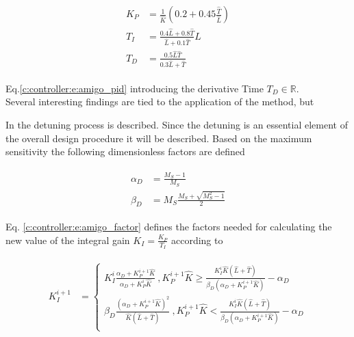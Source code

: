 \begin{align}
\begin{split}
K_P &= \frac{1}{\hat{K}} \left( 0.2 + 0.45 \frac{\hat{T}}{\hat{L}}\right)\\
T_I &= \frac{0.4\hat{L}+0.8\hat{T}}{\hat{L}+0.1\hat{T}}\hat{L}\\
T_D &= \frac{0.5 \hat{L}\hat{T}}{0.3\hat{L}+\hat{T}}
\end{split}
\label{c:controller:e:amigo_pid}
\end{align}

Eq.\ref{c:controller:e:amigo_pid} introducing the derivative Time $T_D \in \mathbb{R}$.\\

Several interesting findings are tied to the application of the method, but 


In \cite[p.253 ff.]{Astrom2006} the detuning process is described. Since the detuning is an essential element of the overall design procedure it will be described. Based on the maximum sensitivity the following dimensionless factors are defined 

\begin{align}
\begin{split}
\alpha_D &= \frac{M_S-1}{M_S}\\
\beta_D &= M_S \frac{M_S+\sqrt{M_S^2 -1}}{2} 
\end{split}
\label{c:controller:e:amigo_factor}
\end{align}

Eq. \ref{c:controller:e:amigo_factor} defines the factors needed for calculating the new value of the integral gain $K_I = \frac{K_P}{T_I}$ according to

\begin{align}
\begin{split}
K_I^{i+1} &= \begin{cases}
	K_I^i \frac{\alpha_D + K_P^{i+1} \hat{K}}{\alpha_D + K_P^{i} \hat{K}} ~, K_P^{i+1} \hat{K} \geq \frac{K_I^{i}\hat{K}\left(\hat{L}+\hat{T}\right)}{\beta_D \left( \alpha_D + K_P^{i+1} \hat{K}\right)} - \alpha_D\\
	\beta_D \frac{\left( \alpha_D + K_P^{i+1} \hat{K} \right)^2}{\hat{K} \left( \hat{L}+ \hat{T} \right)}~, K_P^{i+1} \hat{K} < \frac{K_I^{i}\hat{K}\left(\hat{L}+\hat{T}\right)}{\beta_D \left( \alpha_D + K_P^{i+1} \hat{K}\right)} - \alpha_D\\
\end{cases}
\end{split}
\label{c:control:e:amigo_detune}
\end{align} 

